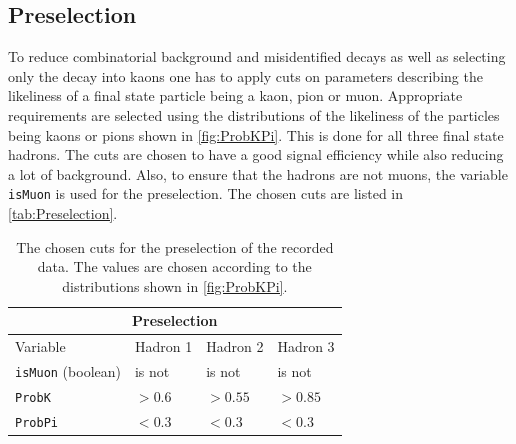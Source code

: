 \subsection{Preselection}

To reduce combinatorial background and misidentified decays as well as selecting only the decay into kaons one has to apply cuts on parameters describing the likeliness
of a final state particle being a kaon, pion or muon. Appropriate requirements are selected using the distributions of the likeliness of the particles being kaons or pions 
shown in \autoref{fig:ProbKPi}. This is done for all three final state
hadrons. The cuts are chosen to have a good signal efficiency while also reducing a lot of background. Also, to ensure that the
hadrons are not muons, the variable \texttt{isMuon} is used for the preselection. The chosen cuts are listed
in \autoref{tab:Preselection}.
\begin{table}[h!]
  \centering
    \begin{tabular}{ |p{3cm}||p{3cm}|p{3cm}|p{3cm}|  }
      \hline
      \multicolumn{4}{|c|}{Preselection} \\
      \hline
      Variable & Hadron 1 &Hadron 2 &Hadron 3\\
      \hline
      \texttt{isMuon} (boolean)   & is not &is not&  is not\\
      \texttt{ProbK}&   $> 0.6$  &$> 0.55$   &$> 0.85$\\
      \texttt{ProbPi} & $< 0.3$ & $< 0.3$&  $< 0.3$\\
      \hline   
    \end{tabular}
    \caption{The chosen cuts for the preselection of the recorded data. The values are chosen according to the distributions shown in \autoref{fig:ProbKPi}.}
    \label{tab:Preselection}
\end{table}

